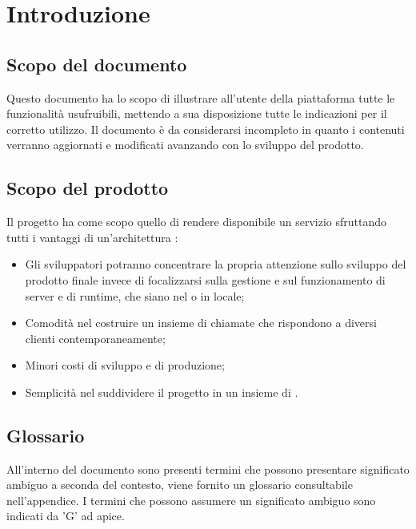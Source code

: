 \section{Introduzione}
\label{introduzione}
\subsection{Scopo del documento}
Questo documento ha lo scopo di illustrare all'utente della piattaforma tutte le funzionalità usufruibili, mettendo a sua disposizione tutte le indicazioni per il corretto utilizzo. Il documento è da considerarsi incompleto in quanto i contenuti verranno aggiornati e modificati avanzando con lo sviluppo del prodotto.
\subsection{Scopo del prodotto} 
Il progetto {\NomeProgetto} ha come scopo quello di rendere disponibile un servizio  sfruttando tutti i vantaggi di un'architettura :
\begin{itemize}
	\item Gli sviluppatori potranno concentrare la propria attenzione sullo sviluppo del prodotto finale invece di focalizzarsi sulla gestione e sul funzionamento di server e di runtime, che siano nel  o in locale;
	\item Comodità nel costruire un insieme di chiamate  che rispondono a diversi clienti contemporaneamente;
	\item Minori costi di sviluppo e di produzione;
	\item Semplicità nel suddividere il progetto in un insieme di .
\end{itemize}
\subsection{Glossario}
All'interno del documento sono presenti termini che possono presentare significato ambiguo a seconda del contesto, viene fornito un glossario consultabile nell'appendice. I termini che possono assumere un significato ambiguo sono indicati da 'G' ad apice. 
